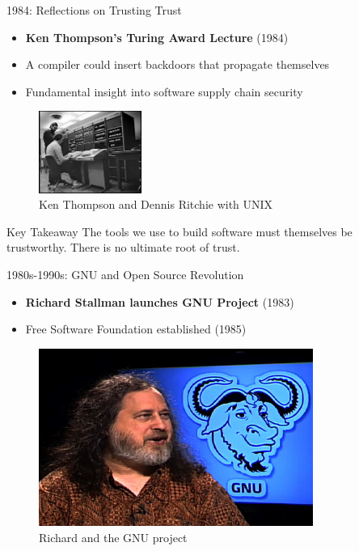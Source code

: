 \documentclass{beamer}
\begin{document}
\begin{frame}[t]{1984: Reflections on Trusting Trust}
\begin{itemize}
    \item \textbf{Ken Thompson's Turing Award Lecture} (1984)
    \item A compiler could insert backdoors that propagate themselves
    \item Fundamental insight into software supply chain security
\end{itemize}
\begin{figure}
    \includegraphics[width=0.3\textwidth]{images/Ken_UNIX.png}
    \caption{Ken Thompson and Dennis Ritchie with UNIX}
\end{figure}
\pause
\begin{alertblock}{Key Takeaway}
    The tools we use to build software must themselves be trustworthy. There is no ultimate root of trust.
\end{alertblock}
\end{frame}



\begin{frame}[t]{1980s-1990s: GNU and Open Source Revolution}
    \begin{itemize}
        \item \textbf{Richard Stallman launches GNU Project} (1983)
        \item Free Software Foundation established (1985)
    \end{itemize}
    \begin{figure}
        \includegraphics[width=0.8\textwidth]{images/stallman.jpg}
        \caption{Richard and the GNU project}
    \end{figure}
\end{frame}
\end{document}
